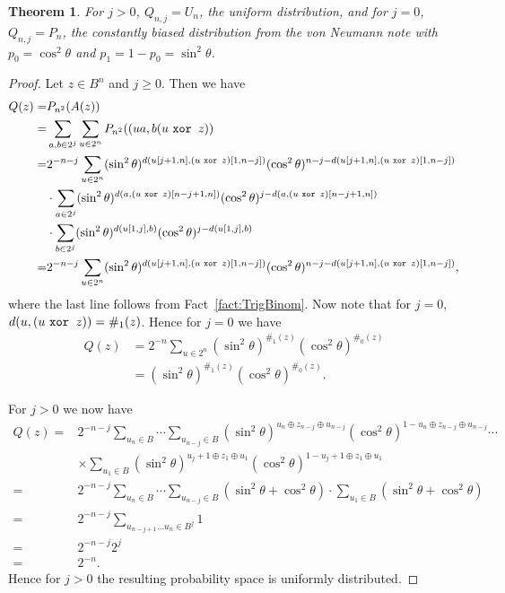 \documentclass{mscs}
\newtheorem{Theorem}{Theorem}
\begin{document}
\begin{Theorem}
	For $j>0$, $Q_{n,j}=U_n$, the uniform distribution, and for $j=0$, $Q_{n,j} = P_n$, the constantly biased distribution from the von Neumann note with $p_0 = \cos^2\theta$ and $p_1 = 1-p_0 = \sin^2\theta$.
\end{Theorem}
\begin{proof}
	Let $z \in B^n$ and $j \ge 0$. Then we have
	\begin{align*}
		Q(z) =& P_{n^2}(A(z))\\
		=& \sum_{a,b\in 2^j}\sum_{u\in 2^n}P_{n^2}((ua,b(u \text{ \tt xor } z))\\
		=& 2^{-n-j}\sum_{u\in 2^n}(\sin^2\theta)^{d(u[j+1,n],(u\text{ \tt xor } z)[1,n-j])}(\cos^2\theta)^{n-j-d(u[j+1,n],(u\text{ \tt xor } z)[1,n-j])}\\&\cdot \sum_{a\in 2^j}(\sin^2\theta)^{d(a,(u\text{ \tt xor } z)[n-j+1,n])}(\cos^2\theta)^{j-d(a,(u\text{ \tt xor } z)[n-j+1,n])} \\&\cdot\sum_{b\in 2^j}(\sin^2\theta)^{d(u[1,j],b)}(\cos^2\theta)^{j-d(u[1,j],b)}\\
		=& 2^{-n-j}\sum_{u\in 2^n}(\sin^2\theta)^{d(u[j+1,n],(u\text{ \tt xor } z)[1,n-j])}(\cos^2\theta)^{n-j-d(u[j+1,n],(u\text{ \tt xor } z)[1,n-j])},
	\end{align*}
	where the last line follows from Fact~\ref{fact:TrigBinom}. Now note that for $j=0$, $d(u,(u\text{ \tt xor } z)) = \#_1(z)$. Hence for $j=0$ we have
\begin{align*}
	Q(z) &= 2^{-n}\sum_{u\in 2^n}(\sin^2\theta)^{\#_1(z)}(\cos^2\theta)^{\#_0(z)}\\
	&= (\sin^2\theta)^{\#_1(z)}(\cos^2\theta)^{\#_0(z)}.
\end{align*}

For $j>0$ we now have
\begin{align*}
	Q(z) =& 2^{-n-j}\sum_{u_n\in B}\cdots \sum_{u_{n-j}\in B}(\sin^2\theta)^{u_n \oplus z_{n-j}\oplus u_{n-j}}(\cos^2\theta)^{1-u_n \oplus z_{n-j}\oplus u_{n-j}}\cdots\\&\times \sum_{u_1 \in B} (\sin^2\theta)^{u_j+1 \oplus z_{1}\oplus u_{1}}(\cos^2\theta)^{1-u_j+1 \oplus z_{1}\oplus u_{1}}\\
	=& 2^{-n-j}\sum_{u_n\in B}\cdots \sum_{u_{n-j}\in B}(\sin^2\theta + \cos^2\theta)\cdot \sum_{u_1 \in B}(\sin^2\theta + \cos^2\theta)\\
	=& 2^{-n-j}\sum_{u_{n-j+1}\dots u_n \in B^j}1\\
	=& 2^{-n-j}2^j\\
	=& 2^{-n}.
\end{align*}
Hence for $j>0$  the resulting probability space is uniformly distributed.
\end{proof}
\fi
\end{document}
